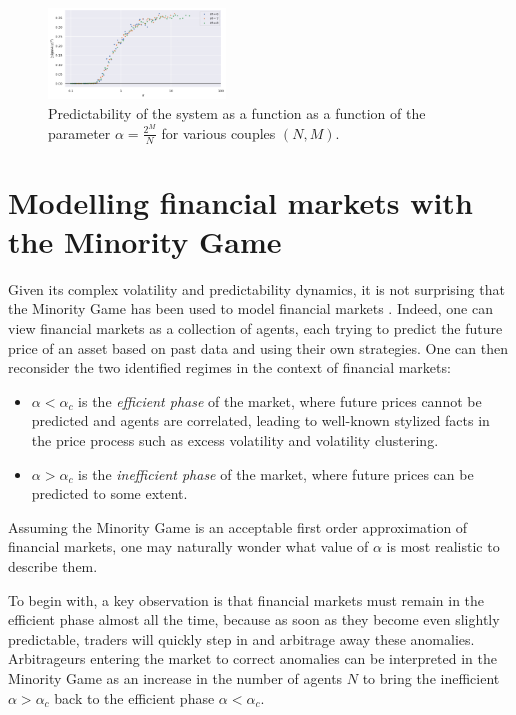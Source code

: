 \documentclass[a4paper, amsfonts, amssymb, amsmath, reprint, showkeys, nofootinbib, twoside]{revtex4-1}
\begin{document}
\begin{figure}[H]
    \centering
    \includegraphics[width=0.42\textwidth]{figures/predictability.png}
    \caption{Predictability of the system as a function as a function of the parameter $\alpha = \frac{2^M}{N}$ for various couples $(N, M)$.}
    \label{fig:predictability}
\end{figure}


\section{Modelling financial markets with the Minority Game}
\label{sec:financial-markets}

Given its complex volatility and predictability dynamics, it is not surprising that the Minority Game has been used to model financial markets \cite{Challet_2004}. Indeed, one can view financial markets as a collection of agents, each trying to predict the future price of an asset based on past data and using their own strategies. One can then reconsider the two identified regimes in the context of financial markets:
\begin{itemize}
    \item $\alpha < \alpha_c$ is the \textit{efficient phase} of the market, where future prices cannot be predicted and agents are correlated, leading to well-known stylized facts in the price process such as excess volatility and volatility clustering.
    \item $\alpha > \alpha_c$ is the \textit{inefficient phase} of the market, where future prices can be predicted to some extent.
\end{itemize}
Assuming the Minority Game is an acceptable first order approximation of financial markets, one may naturally wonder what value of $\alpha$ is most realistic to describe them.

To begin with, a key observation is that financial markets must remain in the efficient phase almost all the time, because as soon as they become even slightly predictable, traders will quickly step in and arbitrage away these anomalies. Arbitrageurs entering the market to correct anomalies can be interpreted in the Minority Game as an increase in the number of agents $N$ to bring the inefficient $\alpha > \alpha_c$ back to the efficient phase $\alpha < \alpha_c$.
\end{document}
